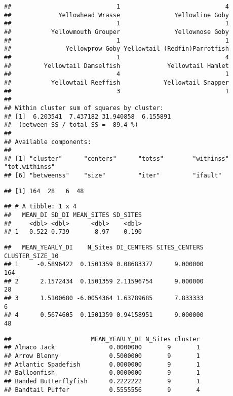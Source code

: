 \documentclass[
]{article}
\begin{document}
\begin{verbatim}
##                             1                             4 
##             Yellowhead Wrasse               Yellowline Goby 
##                             1                             1 
##           Yellowmouth Grouper               Yellownose Goby 
##                             1                             1 
##               Yellowprow Goby Yellowtail (Redfin)Parrotfish 
##                             1                             4 
##         Yellowtail Damselfish             Yellowtail Hamlet 
##                             4                             1 
##           Yellowtail Reeffish            Yellowtail Snapper 
##                             3                             1 
## 
## Within cluster sum of squares by cluster:
## [1]  6.203541  7.437182 31.940858  6.155891
##  (between_SS / total_SS =  89.4 %)
## 
## Available components:
## 
## [1] "cluster"      "centers"      "totss"        "withinss"     "tot.withinss"
## [6] "betweenss"    "size"         "iter"         "ifault"
\end{verbatim}

\begin{verbatim}
## [1] 164  28   6  48
\end{verbatim}

\begin{verbatim}
## # A tibble: 1 x 4
##   MEAN_DI SD_DI MEAN_SITES SD_SITES
##     <dbl> <dbl>      <dbl>    <dbl>
## 1   0.522 0.739       8.97    0.190
\end{verbatim}

\begin{verbatim}
##   MEAN_YEARLY_DI    N_Sites DI_CENTERS SITES_CENTERS CLUSTER_SIZE_10
## 1     -0.5896422  0.1501359 0.08683377      9.000000             164
## 2      2.1572434  0.1501359 2.11596754      9.000000              28
## 3      1.5100680 -6.0054364 1.63789685      7.833333               6
## 4      0.5674605  0.1501359 0.94158951      9.000000              48
\end{verbatim}

\begin{verbatim}
##                      MEAN_YEARLY_DI N_Sites cluster
## Almaco Jack               0.0000000       9       1
## Arrow Blenny              0.5000000       9       1
## Atlantic Spadefish        0.0000000       9       1
## Balloonfish               0.0000000       9       1
## Banded Butterflyfish      0.2222222       9       1
## Bandtail Puffer           0.5555556       9       4
\end{verbatim}
\end{document}
